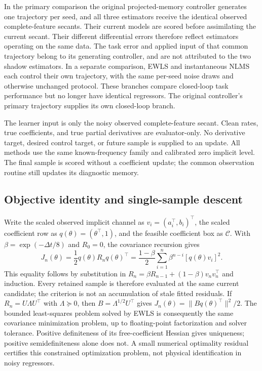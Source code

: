 \documentclass[journal]{IEEEtran}
\begin{document}
In the primary comparison the original projected-memory controller generates
one trajectory per seed, and all three estimators receive the identical observed
complete-feature secants. Their current models are scored before assimilating
the current secant. Their different differential errors therefore reflect
estimators operating on the same data. The task error and applied input of that
common trajectory belong to its generating controller, and are not attributed
to the two shadow estimators. In a separate comparison, EWLS and instantaneous
NLMS each control their own trajectory, with the same per-seed noise draws and
otherwise unchanged protocol. These branches compare closed-loop task
performance but no longer have identical regressors. The original controller's
primary trajectory supplies its own closed-loop branch.

The learner input is only the noisy observed complete-feature secant. Clean
rates, true coefficients, and true partial derivatives are evaluator-only.
No derivative target, desired control target, or future sample is supplied to
an update. All methods use the same known-frequency family and calibrated
zero implicit level. The final sample is scored without a coefficient update;
the common observation routine still updates its diagnostic memory.

\subsection{Objective identity and single-sample descent}
Write the scaled observed implicit channel as $v_i=(a_i^\top,b_i)^\top$,
the scaled coefficient row as $q(\theta)=(\theta^\top,1)$, and the feasible
coefficient box as $\mathcal C$. With $\beta=\exp(-\Delta t/8)$ and $R_0=0$,
the covariance recursion gives
\begin{equation}
 J_n(\theta)=\frac12q(\theta)R_nq(\theta)^\top
 =\frac{1-\beta}{2}\sum_{i=1}^n\beta^{n-i}
       [q(\theta)v_i]^2.
\end{equation}
This equality follows by substitution in
$R_n=\beta R_{n-1}+(1-\beta)v_nv_n^\top$ and induction.
Every retained sample is therefore evaluated at the same current candidate;
the criterion is not an accumulation of stale fitted residuals. If
$R_n=U\Lambda U^\top$ with $\Lambda\succeq0$, then
$B=\Lambda^{1/2}U^\top$ gives
$J_n(\theta)=\|Bq(\theta)^\top\|^2/2$. The bounded least-squares
problem solved by EWLS is consequently the same covariance minimization
problem, up to floating-point factorization and solver tolerance. Positive
definiteness of its free-coefficient Hessian gives uniqueness; positive
semidefiniteness alone does not. A small numerical optimality residual certifies
this constrained optimization problem, not physical identification in noisy
regressors.
\end{document}

